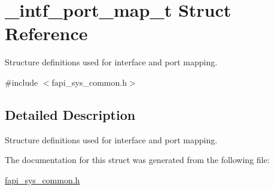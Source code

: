 \hypertarget{struct__intf__port__map__t}{\section{\-\_\-intf\-\_\-port\-\_\-map\-\_\-t Struct Reference}
\label{struct__intf__port__map__t}
}


Structure definitions used for interface and port mapping.  




{\ttfamily \#include $<$fapi\-\_\-sys\-\_\-common.\-h$>$}



\subsection{Detailed Description}
Structure definitions used for interface and port mapping. 

The documentation for this struct was generated from the following file\-:\begin{DoxyCompactItemize}
\item 
\hyperlink{fapi__sys__common_8h}{fapi\-\_\-sys\-\_\-common.\-h}\end{DoxyCompactItemize}
